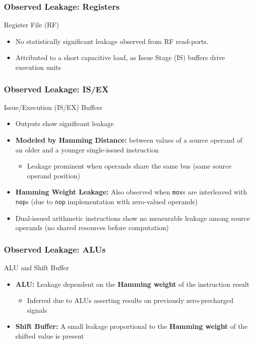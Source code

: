 
\begin{frame}
    \frametitle{Observed Leakage: Registers}
    \begin{block}{Register File (RF)}
        \begin{itemize}
            \item No statistically significant leakage observed from RF read-ports.
            \item Attributed to a short capacitive load, as Issue Stage (IS) buffers drive execution units
        \end{itemize}
    \end{block}
\end{frame}

\begin{frame}
    \frametitle{Observed Leakage: IS/EX}
    \begin{block}{Issue/Execution (IS/EX) Buffers}
        \begin{itemize}
            \item Outputs show significant leakage
            \item \textbf{Modeled by Hamming Distance:} between values of a source operand of an older and a younger single-issued instruction
                \begin{itemize}
                    \item Leakage prominent when operands share the same bus (same source operand position)
                \end{itemize}
            \item \textbf{Hamming Weight Leakage:} Also observed when \texttt{mov}s are interleaved with \texttt{nop}s (due to \texttt{nop} implementation with zero-valued operands)
            \item Dual-issued arithmetic instructions show no measurable leakage among source operands (no shared resources before computation)
        \end{itemize}
    \end{block}
\end{frame}



\begin{frame}
    \frametitle{Observed Leakage: ALUs }
    \begin{block}{ALU and Shift Buffer}
        \begin{itemize}
            \item \textbf{ALU:} Leakage dependent on the \textbf{Hamming weight} of the instruction result
                \begin{itemize}
                    \item Inferred due to ALUs asserting results on previously zero-precharged signals
                \end{itemize}
            \item \textbf{Shift Buffer:} A small leakage proportional to the \textbf{Hamming weight} of the shifted value is present
        \end{itemize}
    \end{block}
\end{frame}

